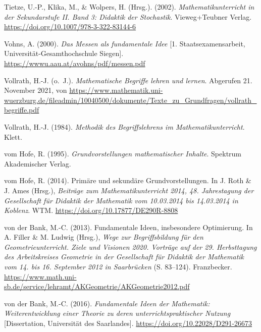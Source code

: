 \documentclass[
  ngerman,
]{scrbook}
\newlength{\cslhangindent}
\newlength{\cslentryspacingunit} %
\newenvironment{CSLReferences}[2] %
 {%
  \setlength{\parindent}{0pt}
  \ifodd #1
  \let\oldpar\par
  \def\par{\hangindent=\cslhangindent\oldpar}
  \fi
  \setlength{\parskip}{#2\cslentryspacingunit}
 }%
 {}
\theoremstyle{definition}
\theoremstyle{definition}
\theoremstyle{definition}
\theoremstyle{definition}
\theoremstyle{remark}
\begin{document}
\begin{CSLReferences}{1}{0}
\leavevmode{}%
Tietze, U.-P., Klika, M., \& Wolpers, H. (Hrsg.). (2002). \emph{Mathematikunterricht in der {Sekundarstufe} {II}. {Band} 3: {Didaktik} der {Stochastik}}. Vieweg+Teubner Verlag. \url{https://doi.org/10.1007/978-3-322-83144-6}

\leavevmode{}%
Vohns, A. (2000). \emph{Das {Messen} als fundamentale {Idee}} {[}1. Staatsexamensarbeit, Universität-Gesamthochschule Siegen{]}. \url{https://wwwu.aau.at/avohns/pdf/messen.pdf}

\leavevmode{}%
Vollrath, H.-J. (o.~J.). \emph{Mathematische {Begriffe} lehren und lernen}. Abgerufen 21. November 2021, von \url{https://www.mathematik.uni-wuerzburg.de/fileadmin/10040500/dokumente/Texte_zu_Grundfragen/vollrath_begriffe.pdf}

\leavevmode{}%
Vollrath, H.-J. (1984). \emph{Methodik des {Begriffslehrens} im {Mathematikunterricht}}. Klett.

\leavevmode{}%
vom Hofe, R. (1995). \emph{Grundvorstellungen mathematischer {Inhalte}}. Spektrum Akademischer Verlag.

\leavevmode{}%
vom Hofe, R. (2014). Primäre und sekundäre {Grundvorstellungen}. In J. Roth \& J. Ames (Hrsg.), \emph{Beiträge zum {Mathematikunterricht} 2014, 48. {Jahrestagung} der {Gesellschaft} für {Didaktik} der {Mathematik} vom 10.03.2014 bis 14.03.2014 in {Koblenz}}. WTM. \url{https://doi.org/10.17877/DE290R-8808}

\leavevmode{}%
von der Bank, M.-C. (2013). Fundamentale {Ideen}, insbesondere {Optimierung}. In A. Filler \& M. Ludwig (Hrsg.), \emph{Wege zur {Begriffsbildung} für den {Geometrieunterricht}. {Ziele} und {Visionen} 2020. {Vorträge} auf der 29. {Herbsttagung} des {Arbeitskreises} {Geometrie} in der {Gesellschaft} für {Didaktik} der {Mathematik} vom 14. bis 16. {September} 2012 in {Saarbrücken}} (S. 83--124). Franzbecker. \url{https://www.math.uni-sb.de/service/lehramt/AKGeometrie/AKGeometrie2012.pdf}

\leavevmode{}%
von der Bank, M.-C. (2016). \emph{Fundamentale {Ideen} der {Mathematik}: {Weiterentwicklung} einer {Theorie} zu deren unterrichtspraktischer {Nutzung}} {[}Dissertation, Universität des Saarlandes{]}. \url{https://doi.org/10.22028/D291-26673}


\end{CSLReferences}
\end{document}
